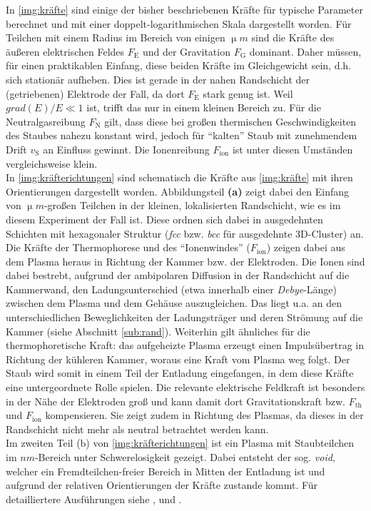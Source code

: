 \documentclass[numbers=noenddot,a4paper,notitlepage,twoside,BCOR15mm]{scrbook}
\newcommand{\ix}[1]{_\text{#1}}
\newcommand{\tilt}[1]{\textit{#1}}
\newcommand{\grad}[1]{\textit{grad}\left(#1\right)}
\newcommand{\fett}[1]{\textbf{#1}}
\begin{document}
			In \autoref{img:kräfte} sind einige der bisher beschriebenen Kräfte für typische Parameter berechnet und mit einer doppelt-logarithmischen Skala dargestellt worden. Für Teilchen mit einem Radius im Bereich von einigen $\unit{\upmu m}$ sind die Kräfte des äußeren elektrischen Feldes $F\ix{E}$ und der Gravitation $F\ix{G}$ dominant. Daher müssen, für einen praktikablen Einfang, diese beiden Kräfte im Gleichgewicht sein, d.h. sich stationär aufheben. Dies ist gerade in der nahen Randschicht der (getriebenen) Elektrode der Fall, da dort $F\ix{E}$ stark genug ist. Weil $\grad{E}/E\ll1$ ist, trifft das nur in einem kleinen Bereich zu. Für die Neutralgasreibung $F\ix{N}$ gilt, dass diese bei großen thermischen Geschwindigkeiten des Staubes nahezu konstant wird, jedoch für "`kalten"' Staub mit zunehmendem Drift $v\ix{S}$ an Einfluss gewinnt. Die Ionenreibung $F\ix{ion}$ ist unter diesen Umständen vergleichsweise klein.\\
			In \autoref{img:kräfterichtungen} sind schematisch die Kräfte aus \autoref{img:kräfte} mit ihren Orientierungen dargestellt worden. Abbildungsteil \fett{(a)} zeigt dabei den Einfang von $\unit{\upmu m}$-großen Teilchen in der kleinen, lokalisierten Randschicht, wie es im diesem Experiment der Fall ist. Diese ordnen sich dabei in ausgedehnten Schichten mit hexagonaler Struktur (\tilt{fcc} bzw. \tilt{bcc} für ausgedehnte 3D-Cluster) an. Die Kräfte der Thermophorese und des "`Ionenwindes"' ($F\ix{ion}$) zeigen dabei aus dem Plasma heraus in Richtung der Kammer bzw. der Elektroden. Die Ionen sind dabei bestrebt, aufgrund der ambipolaren Diffusion in der Randschicht auf die Kammerwand, den Ladungsunterschied (etwa innerhalb einer \tilt{Debye}-Länge) zwischen dem Plasma und dem Gehäuse auszugleichen. Das liegt u.a. an den unterschiedlichen Beweglichkeiten der Ladungsträger und deren Strömung auf die Kammer (siehe Abschnitt \ref{sub:rand}). Weiterhin gilt ähnliches für die thermophoretische Kraft: das aufgeheizte Plasma erzeugt einen Impulsübertrag in Richtung der kühleren Kammer, woraus eine Kraft vom Plasma weg folgt. Der Staub wird somit in einem Teil der Entladung eingefangen, in dem diese Kräfte eine untergeordnete Rolle spielen. Die relevante elektrische Feldkraft ist besonders in der Nähe der Elektroden groß und kann damit dort Gravitationskraft bzw. $F\ix{th}$ und $F\ix{ion}$ kompensieren. Sie zeigt zudem in Richtung des Plasmas, da dieses in der Randschicht nicht mehr als neutral betrachtet werden kann.\\
			Im zweiten Teil (b) von \autoref{img:kräfterichtungen} ist ein Plasma mit Staubteilchen im $\unit{nm}$-Bereich unter Schwerelosigkeit gezeigt. Dabei entsteht der sog. \tilt{void}, welcher ein Fremdteilchen-freier Bereich in Mitten der Entladung ist und aufgrund der relativen Orientierungen der Kräfte zustande kommt. Für detailliertere Ausführungen siehe \cite{Dorier95}, \cite{Morfill99} und \cite{Goree99a}.
\end{document}
